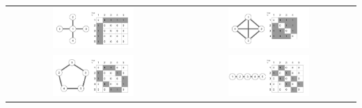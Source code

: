 \begin{table}[tp]
  \centering
\begin{tabu}{cc}
	\includegraphics[width=0.49\textwidth]{images/pattern_star}  &
	\includegraphics[width=0.49\textwidth]{images/pattern_full} \\
	\includegraphics[width=0.49\textwidth]{images/pattern_circle} &
	\includegraphics[width=0.49\textwidth]{images/pattern_line} 
\end{tabu}
\end{table}
